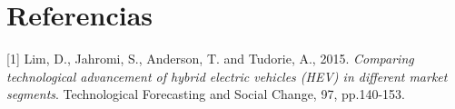 \documentclass[11pt]{article}
\begin{document}
    \hypertarget{referencias}{%
\section{Referencias}\label{referencias}}

    {[}1{]} Lim, D., Jahromi, S., Anderson, T. and Tudorie, A., 2015.
\emph{Comparing technological advancement of hybrid electric vehicles
(HEV) in different market segments}. Technological Forecasting and
Social Change, 97, pp.140-153.


    
    
    
\end{document}

